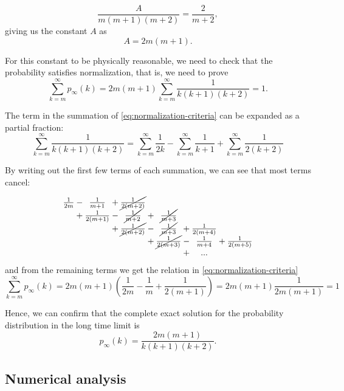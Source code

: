 \begin{equation}
	\frac{A}{m(m+1)(m+2)} = \frac{2}{m+2}, 
\end{equation}
giving us the constant $A$ as
\begin{equation}
	A = 2m(m+1).
	\label{eq:normalization-constant}
\end{equation}

For this constant to be physically reasonable, we need to check that the probability satisfies normalization, that is, we need to prove
\begin{equation}
	\sum_{k=m}^\infty p_{\infty}(k) = 2m(m+1)\sum_{k=m}^\infty \frac{1}{k(k+1)(k+2)} = 1. 
	\label{eq:normalization-criteria}
\end{equation}

The term in the summation of \autoref{eq:normalization-criteria} can be expanded as a partial fraction:
\begin{equation}
	\sum_{k=m}^\infty \frac{1}{k(k+1)(k+2)} = \sum_{k=m}^\infty \frac{1}{2k} - \sum_{k=m}^\infty \frac{1}{k+1} + \sum_{k=m}^\infty \frac{1}{2(k+2)}
	\label{eq:partial-fractions}
\end{equation}

By writing out the first few terms of each summation, we can see that most terms cancel:

\begin{equation}
\setlength{\arraycolsep}{0pt}%
\newcolumntype{B}{>{{}}c<{{}}}
\begin{array}{ B l B l B l B l B l B}
	\frac{1}{2m} & {}-{} &\frac{1}{m+1} & {}+{} & \cancel{\frac{1}{2(m+2)}} & \\
	& {}+{} & \frac{1}{2(m+1)} & {}-{} &\cancel{\frac{1}{m+2}} & {}+{} &\cancel{\frac{1}{m+3}} \\
	& & & {}+{} & \cancel{\frac{1}{2(m+2)}} & {}-{} & \cancel{\frac{1}{m+3}} & {}+{} &\frac{1}{2(m+4)} \\
	& & & & & {}+{}& \cancel{\frac{1}{2(m+3)}} & {}-{} & \frac{1}{m+4} & {}+{} & \frac{1}{2(m+5)} \\
	& & & & & & & {}+{}& ...\\
\end{array}
\label{eq:summation-cancel}
\end{equation}
and from the remaining terms we get the relation in \autoref{eq:normalization-criteria}
\begin{equation}
	 \sum_{k=m}^\infty p_{\infty}(k) = 2m(m+1)\left ( \frac{1}{2m} - \frac{1}{m} + \frac{1}{2(m+1)} \right ) = 2m(m+1) \frac{1}{2m(m+1)} = 1
	 \label{eq:normalization-satisfied}
\end{equation}

Hence, we can confirm that the complete exact solution for the probability distribution in the long time limit is 
\begin{equation}
	p_{\infty}(k) = \frac{2m(m+1)}{k(k+1)(k+2)}.
	\label{eq:p-infinity-solution}
\end{equation}

\subsection{Numerical analysis}\label{subsection:ppa-numerical-analysis}
